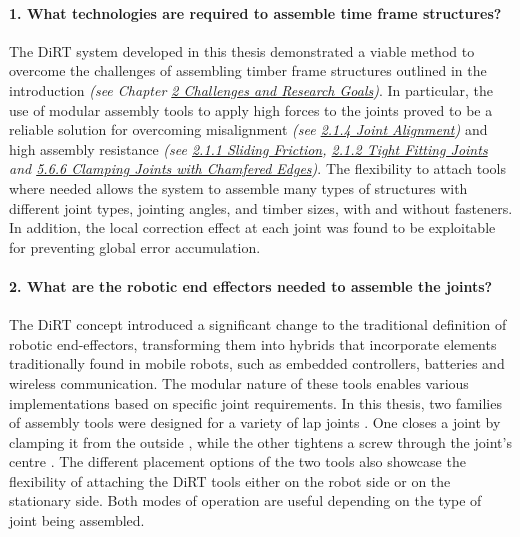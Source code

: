 	\paragraph{1. What technologies are required to assemble time frame structures?}

The DiRT system developed in this thesis demonstrated a viable method to overcome the challenges of assembling timber frame structures outlined in the introduction \textit{(see Chapter \ul{2 Challenges and Research Goals})}. In particular, the use of modular assembly tools to apply high forces to the joints proved to be a reliable solution for overcoming misalignment \textit{(see \ul{2.1.4 Joint Alignment}) }and high assembly resistance \textit{(see \ul{2.1.1 Sliding Friction}, \ul{2.1.2 Tight Fitting Joints} and \ul{5.6.6 Clamping Joints with Chamfered Edges})}. The flexibility to attach tools where needed allows the system to assemble many types of structures with different joint types, jointing angles, and timber sizes, with and without fasteners. In addition, the local correction effect at each joint was found to be exploitable for preventing global error accumulation.

\paragraph{2. What are the robotic end effectors needed to assemble the joints?}

The DiRT concept introduced a significant change to the traditional definition of robotic end-effectors, transforming them into hybrids that incorporate elements traditionally found in mobile robots, such as embedded controllers, batteries and wireless communication. The modular nature of these tools enables various implementations based on specific joint requirements. In this thesis, two families of assembly tools were designed for a variety of lap joints . One closes a joint by clamping it from the outside , while the other tightens a screw through the joint's centre . The different placement options of the two tools also showcase the flexibility of attaching the DiRT tools either on the robot side or on the stationary side. Both modes of operation are useful depending on the type of joint being assembled.

